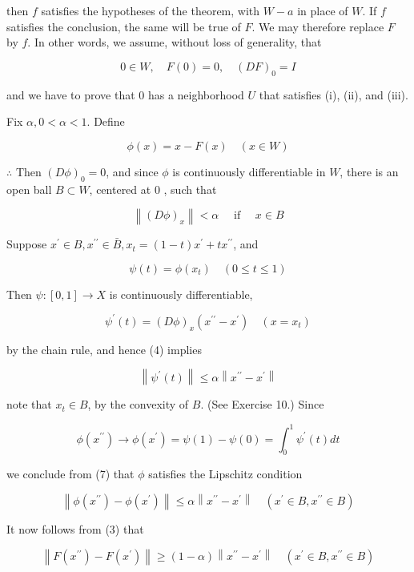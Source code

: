 \documentclass[10pt]{article}
\begin{document}
then $f$ satisfies the hypotheses of the theorem, with $W-a$ in place of $W$. If $f$ satisfies the conclusion, the same will be true of $F$. We may therefore replace $F$ by $f$. In other words, we assume, without loss of generality, that

$$
0 \in W, \quad F(0)=0, \quad(D F)_{0}=I
$$

and we have to prove that 0 has a neighborhood $U$ that satisfies (i), (ii), and (iii).

Fix $\alpha, 0<\alpha<1$. Define

$$
\phi(x)=x-F(x) \quad(x \in W)
$$

$\therefore$ Then $(D \phi)_{0}=0$, and since $\phi$ is continuously differentiable in $W$, there is an open ball $B \subset W$, centered at 0 , such that

$$
\left\|(D \phi)_{x}\right\|<\alpha \quad \text { if } \quad x \in B
$$

Suppose $x^{\prime} \in B, x^{\prime \prime} \in \bar{B}, x_{t}=(1-t) x^{\prime}+t x^{\prime \prime}$, and

$$
\psi(t)=\phi\left(x_{t}\right) \quad(0 \leq t \leq 1)
$$

Then $\psi:[0,1] \rightarrow X$ is continuously differentiable,

$$
\psi^{\prime}(t)=(D \phi)_{x}\left(x^{\prime \prime}-x^{\prime}\right) \quad\left(x=x_{t}\right)
$$

by the chain rule, and hence (4) implies

$$
\left\|\psi^{\prime}(t)\right\| \leq \alpha\left\|x^{\prime \prime}-x^{\prime}\right\|
$$

note that $x_{t} \in B$, by the convexity of $B$. (See Exercise 10.) Since

$$
\phi\left(x^{\prime \prime}\right) \rightarrow \phi\left(x^{\prime}\right)=\psi(1)-\psi(0)=\int_{0}^{1} \psi^{\prime}(t) d t
$$

we conclude from (7) that $\phi$ satisfies the Lipschitz condition

$$
\left\|\phi\left(x^{\prime \prime}\right)-\phi\left(x^{\prime}\right)\right\| \leq \alpha\left\|x^{\prime \prime}-x^{\prime}\right\| \quad\left(x^{\prime} \in B, x^{\prime \prime} \in B\right)
$$

It now follows from (3) that

$$
\left\|F\left(x^{\prime \prime}\right)-F\left(x^{\prime}\right)\right\| \geq(1-\alpha)\left\|x^{\prime \prime}-x^{\prime}\right\| \quad\left(x^{\prime} \in B, x^{\prime \prime} \in B\right)
$$
\end{document}
